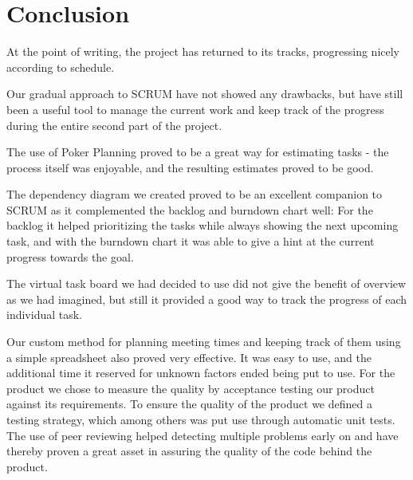 \section{Conclusion}
At the point of writing, the project has returned to its tracks, progressing nicely according to schedule.

Our gradual approach to SCRUM have not showed any drawbacks, but have still been a useful tool to manage the current work and keep track of the progress during the entire second part of the project.

The use of Poker Planning proved to be a great way for estimating tasks - the process itself was enjoyable, and the resulting estimates proved to be good.

The dependency diagram we created proved to be an excellent companion to SCRUM as it complemented the backlog and burndown chart well: For the backlog it helped prioritizing the tasks while always showing the next upcoming task, and with the burndown chart it was able to give a hint at the current progress towards the goal.

The virtual task board we had decided to use did not give the benefit of overview as we had imagined, but still it provided a good way to track the progress of each individual task.

Our custom method for planning meeting times and keeping track of them using a simple spreadsheet also proved very effective. It was easy to use, and the additional time it reserved for unknown factors ended being put to use.
\newpage
For the product we chose to measure the quality by acceptance testing our product against its requirements.
To ensure the quality of the product we defined a testing strategy, which among others was put use through automatic unit tests. The use of peer reviewing helped detecting multiple problems early on and have thereby proven a great asset in assuring the quality of the code behind the product.